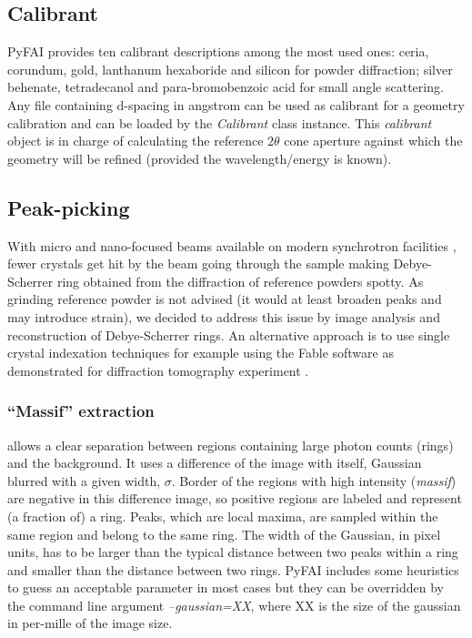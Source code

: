 \documentclass[preprint]{iucr}
\begin{document}
\subsection{Calibrant}
PyFAI provides ten calibrant descriptions among the most used ones: ceria,
corundum, gold, lanthanum hexaboride and silicon for powder diffraction;
silver behenate, tetradecanol and para-bromobenzoic acid for small angle scattering.
Any file containing d-spacing in angstrom can be used as calibrant for a
geometry calibration and can be loaded by the \textit{Calibrant} class instance.
This \textit{calibrant} object is in charge of
calculating the reference $2\theta$ cone aperture
against which the geometry will be refined (provided the wavelength/energy is
known).

\subsection{Peak-picking}
With micro and nano-focused beams available on modern synchrotron facilities
\cite{id13}, fewer crystals get hit by the beam going through the
sample making Debye-Scherrer ring obtained from the diffraction of reference
powders spotty.
As grinding reference powder is not advised (it would at least broaden peaks
and may introduce strain), we decided to
address this issue by image analysis and reconstruction of Debye-Scherrer rings.
An alternative approach is to use single crystal indexation techniques for
example using the Fable software \cite{fable} as demonstrated for diffraction
tomography experiment \cite{bonnin}.

\subsubsection{``Massif'' extraction}
\label{massif}
allows a clear separation between regions containing large
photon counts (rings) and the background.
It uses a difference of the image with itself, Gaussian blurred with a given
width, $\sigma$.
Border of the regions with high intensity (\textit{massif}) are negative in this
difference image, so positive regions are labeled and represent
(a fraction of) a ring. Peaks, which are local maxima,
are sampled within the same region and belong to the same ring.
The width of the Gaussian, in pixel units, has to be larger than the typical
distance between two peaks within a ring and smaller than the distance between two
rings.
PyFAI includes some heuristics to guess an acceptable parameter in most cases
but they can be overridden by the command line argument \textit{--gaussian=XX},
where XX is the size of the gaussian in per-mille of the image size.
\end{document}
